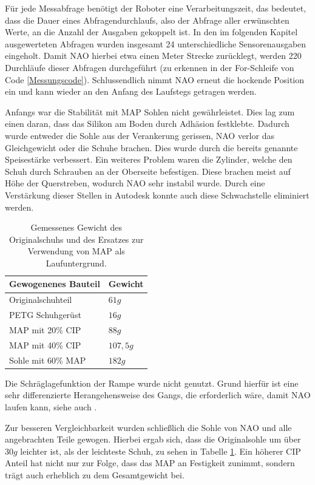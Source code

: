 Für jede Messabfrage benötigt der Roboter eine Verarbeitungszeit, das bedeutet, dass die Dauer eines Abfragendurchlaufs, also der Abfrage aller erwünschten Werte, an die Anzahl der Ausgaben gekoppelt ist. In den im folgenden Kapitel ausgewerteten Abfragen wurden insgesamt 24 unterschiedliche Sensorenausgaben eingeholt. Damit NAO hierbei etwa einen Meter Strecke zurücklegt, werden 220 Durchläufe dieser Abfragen durchgeführt (zu erkennen in der For-Schleife von Code \ref{Messungscode}). Schlussendlich nimmt NAO erneut die hockende Position ein und kann wieder an den Anfang des Laufstegs getragen werden. 

Anfangs war die Stabilität mit MAP Sohlen nicht gewährleistet. Dies lag zum einen daran, dass das Silikon am Boden durch Adhäsion festklebte. Dadurch wurde entweder die Sohle aus der Verankerung gerissen, NAO verlor das Gleichgewicht oder die Schuhe brachen. Dies wurde durch die bereits genannte Speisestärke verbessert. Ein weiteres Problem waren die Zylinder, welche den Schuh durch Schrauben an der Oberseite befestigen. Diese brachen meist auf Höhe der Querstreben, wodurch NAO sehr instabil wurde. Durch eine Verstärkung dieser Stellen in Autodesk konnte auch diese Schwachstelle eliminiert werden. 

\begin{table}
	\vspace{-0.8cm}
	\caption{Gemessenes Gewicht des Originalschuhs und des Ersatzes zur Verwendung von MAP als Laufuntergrund.}\label{gewicht}
	\begin{tabular}{ll}\\\toprule  
		Gewogenenes Bauteil & Gewicht \\\midrule
		Originalschuhteil & $61 \unit{g}$ \\  \midrule
		PETG Schuhgerüst &$16 \unit{g}$ \\  \midrule
		MAP mit 20\% CIP &$88 \unit{g}$ \\  \midrule
		MAP mit 40\% CIP &$107,5 \unit{g}$ \\  \midrule
		Sohle mit 60\% MAP &$182 \unit{g}$ \\  \bottomrule
	\end{tabular}
    \vspace{-2cm}
\end{table} 

Die Schräglagefunktion der Rampe wurde nicht genutzt. Grund hierfür ist eine sehr differenzierte Herangehensweise des Gangs, die erforderlich wäre, damit NAO laufen kann, siehe auch \cite{Lutz_naowalking}.

Zur besseren Vergleichbarkeit wurden schließlich die Sohle von NAO und alle angebrachten Teile gewogen. Hierbei ergab sich, dass die Originalsohle um über $30\unit{g}$ leichter ist, als der leichteste Schuh, zu sehen in Tabelle \ref{gewicht}. Ein höherer CIP Anteil hat nicht nur zur Folge, dass das MAP an Festigkeit zunimmt, sondern trägt auch erheblich zu dem Gesamtgewicht bei. 


